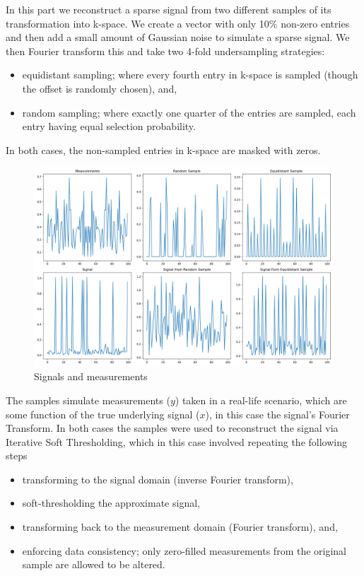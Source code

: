 \documentclass[12pt]{article}
\begin{document}
In this part we reconstruct a sparse signal from two different samples of its transformation into k-space.
We create a vector with only 10\% non-zero entries and then add a small amount of Gaussian noise to simulate a sparse signal.
We then Fourier transform this and take two 4-fold undersampling strategies:
\begin{itemize}
    \item equidistant sampling; where every fourth entry in k-space is sampled (though the offset is randomly chosen), and,
    \item random sampling; where exactly one quarter of the entries are sampled, each entry having equal selection probability.
\end{itemize}
In both cases, the non-sampled entries in k-space are masked with zeros.

\begin{figure}[htp]
    \includegraphics[scale=0.36]{figures/signal.png}
    \caption{Signals and measurements}
    \label{fig:signal}
\end{figure}

The samples simulate measurements ($y$) taken in a real-life scenario, which are some function of the true underlying signal ($x$),
in this case the signal's Fourier Transform.
In both cases the samples were used to reconstruct the signal via Iterative Soft Thresholding,
which in this case involved repeating the following steps
\begin{itemize}
    \item transforming to the signal domain (inverse Fourier transform),
    \item soft-thresholding the approximate signal,
    \item transforming back to the measurement domain (Fourier transform), and,
    \item enforcing data consistency; only zero-filled measurements from the original sample are allowed to be altered.
\end{itemize}
\end{document}
